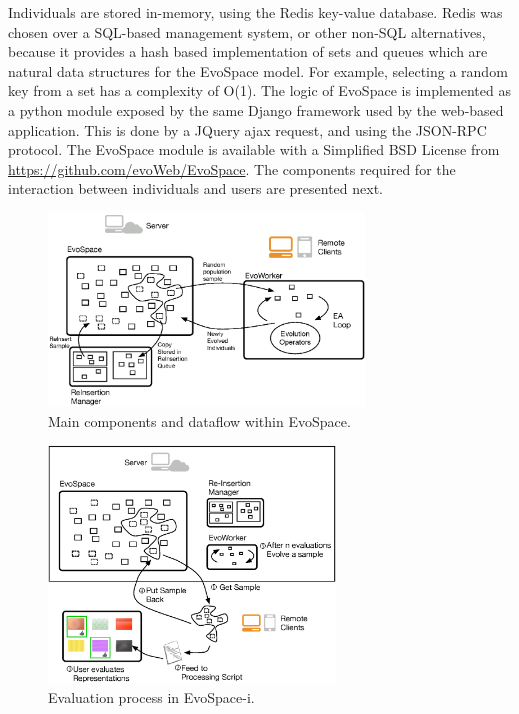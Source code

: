 \documentclass{sig-alternate}
\begin{document}
Individuals are stored in-memory, using the Redis key-value database. Redis was chosen over a SQL-based management system, or other non-SQL alternatives, because it provides a hash based implementation of sets and queues which are natural data structures for the EvoSpace model. For example, selecting a random key from a set has a complexity of O(1). The logic of EvoSpace is implemented as a python module exposed by the same Django framework used by the web-based application. This is done by a JQuery ajax request, and using the  JSON-RPC protocol.  The EvoSpace module is available with a Simplified BSD License from \url{https://github.com/evoWeb/EvoSpace}.  The components required for the interaction between individuals and users are presented next.

\begin{figure}[!t]
    \centering
        \includegraphics[width=3.3in]{evospaceExample.eps}
    \caption{Main components and dataflow within EvoSpace.}
    \label{fig:evo}
\end{figure}



\begin{figure}[!t]
    \centering
        \includegraphics[width=3in]{evospaceInteractive.eps}
    \caption{Evaluation process in EvoSpace-i.}
    \label{fig:evoInteractive}
\end{figure}
\end{document}
